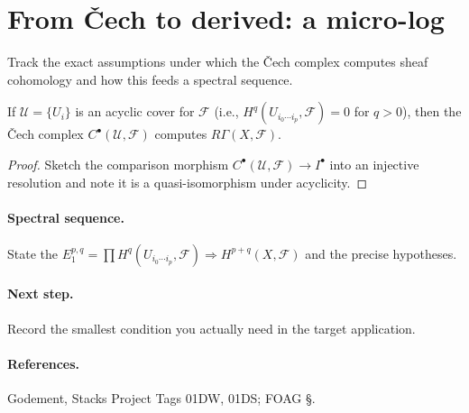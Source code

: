 \section{From \v{C}ech to derived: a micro-log}\label{sec:cech-derived}
Track the exact assumptions under which the \v{C}ech complex computes sheaf
cohomology and how this feeds a spectral sequence.

\begin{lemma}\label{lem:cech-acyclic}
If $\mathcal U=\{U_i\}$ is an acyclic cover for $\mathcal F$ (i.e., $H^q(U_{i_0\cdots i_p},\mathcal F)=0$ for $q>0$), then the \v{C}ech complex $C^\bullet(\mathcal U,\mathcal F)$ computes $R\Gamma(X,\mathcal F)$.
\end{lemma}

\begin{proof}
Sketch the comparison morphism $C^\bullet(\mathcal U,\mathcal F)\to I^\bullet$
into an injective resolution and note it is a quasi-isomorphism under acyclicity.
\end{proof}

\paragraph{Spectral sequence.}
State the $E_1^{p,q}= \prod H^q(U_{i_0\cdots i_p},\mathcal F)\Rightarrow H^{p+q}(X,\mathcal F)$
and the precise hypotheses.

\paragraph{Next step.}
Record the smallest condition you actually need in the target application.

\paragraph{References.}
Godement, Stacks Project Tags 01DW, 01DS; FOAG §.
